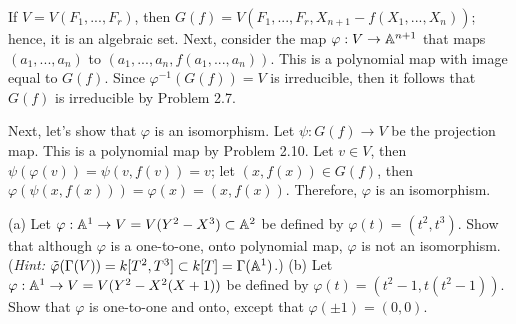 \begin{solution}
    If $V = V(F_1, ..., F_r)$, then $G(f) = V(F_1, ..., F_r, X_{n+1} - f(X_1, ..., X_n))$; hence, it is an algebraic set. Next, consider the map $\varphi: V \to \mathbb{A}^{n+1}$ that maps $(a_1, ..., a_n)$ to $(a_1, ..., a_n, f(a_1, ..., a_n))$. This is a polynomial map with image equal to $G(f)$. Since $\varphi^{-1}(G(f)) = V$ is irreducible, then it follows that $G(f)$ is irreducible by Problem 2.7.
    
    Next, let's show that $\varphi$ is an isomorphism. Let $\psi : G(f) \to V$ be the projection map. This is a polynomial map by Problem 2.10. Let $v \in V$, then $\psi(\varphi(v)) = \psi(v, f(v)) = v$; let $(x, f(x)) \in G(f)$, then $\varphi(\psi(x, f(x))) = \varphi(x) = (x, f(x))$. Therefore, $\varphi$ is an isomorphism. \\
\end{solution}

\begin{exercise}
    (a) Let $\varphi : \mathbb{A}^1 \to V = V(Y^2 - X^3) \subset \mathbb{A}^2$ be defined by $\varphi(t) = (t^2, t^3)$. Show that although $\varphi$ is a one-to-one, onto polynomial map, $\varphi$ is not an isomorphism. (\textit{Hint:} $\tilde{\varphi}(\Gamma(V)) = k[T^2, T^3] \subset k[T] = \Gamma(\mathbb{A}^1)$.) (b) Let $\varphi : \mathbb{A}^1 \to V = V(Y^2 - X^2(X+1))$ be defined by $\varphi(t) = (t^2-1, t(t^2-1))$. Show that $\varphi$ is one-to-one and onto, except that $\varphi(\pm 1) = (0,0)$.\\
\end{exercise}

